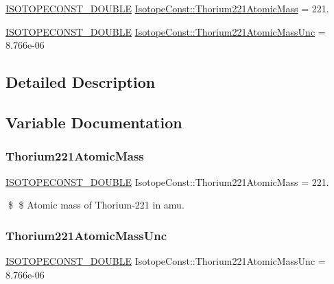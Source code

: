 \begin{DoxyCompactItemize}
\item 
\mbox{\hyperlink{group___isotope_const-_macros_ga8f45a7272ce02c0b4c65c44636ed719a}{I\+S\+O\+T\+O\+P\+E\+C\+O\+N\+S\+T\+\_\+\+D\+O\+U\+B\+LE}} \mbox{\hyperlink{group___isotope_const-_thorium-_th221_gaed93cc4f8f0c798fffcd626d401cf097}{Isotope\+Const\+::\+Thorium221\+Atomic\+Mass}} = 221.
\item 
\mbox{\hyperlink{group___isotope_const-_macros_ga8f45a7272ce02c0b4c65c44636ed719a}{I\+S\+O\+T\+O\+P\+E\+C\+O\+N\+S\+T\+\_\+\+D\+O\+U\+B\+LE}} \mbox{\hyperlink{group___isotope_const-_thorium-_th221_gaff788a3b2a542b7587b3092e0ed56149}{Isotope\+Const\+::\+Thorium221\+Atomic\+Mass\+Unc}} = 8.\+766e-\/06
\end{DoxyCompactItemize}


\subsection{Detailed Description}


\subsection{Variable Documentation}
\mbox{\label{group___isotope_const-_thorium-_th221_gaed93cc4f8f0c798fffcd626d401cf097}} 
\subsubsection{\texorpdfstring{Thorium221\+Atomic\+Mass}{Thorium221AtomicMass}}
{\footnotesize\ttfamily \mbox{\hyperlink{group___isotope_const-_macros_ga8f45a7272ce02c0b4c65c44636ed719a}{I\+S\+O\+T\+O\+P\+E\+C\+O\+N\+S\+T\+\_\+\+D\+O\+U\+B\+LE}} Isotope\+Const\+::\+Thorium221\+Atomic\+Mass = 221.}

\$ \$ Atomic mass of Thorium-\/221 in amu. \mbox{\label{group___isotope_const-_thorium-_th221_gaff788a3b2a542b7587b3092e0ed56149}} 
\subsubsection{\texorpdfstring{Thorium221\+Atomic\+Mass\+Unc}{Thorium221AtomicMassUnc}}
{\footnotesize\ttfamily \mbox{\hyperlink{group___isotope_const-_macros_ga8f45a7272ce02c0b4c65c44636ed719a}{I\+S\+O\+T\+O\+P\+E\+C\+O\+N\+S\+T\+\_\+\+D\+O\+U\+B\+LE}} Isotope\+Const\+::\+Thorium221\+Atomic\+Mass\+Unc = 8.\+766e-\/06}


